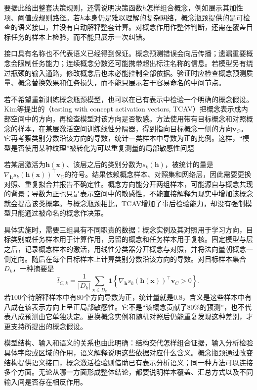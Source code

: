 要据此给出整套决策规则，还需说明决策函数$h$怎样组合概念，例如展示其加性项、阈值或规则路径。若$h$本身仍是难以理解的复杂网络，概念瓶颈提供的是可检查的语义接口，并没有自动解释整套计算。对概念作用作整体判断，还需在覆盖目标任务的样本上检验，而不能只展示一次纠错。

接口具有名称也不代表语义已经得到保证。概念预测错误会向后传播；遗漏重要概念会限制任务能力；连续概念分数还可能携带超出标注名称的信息。若模型另有绕过瓶颈的输入通路，修改概念后也未必能控制全部依据。验证时应检查概念预测质量、概念替换效果和任务损失，而不能只展示若干容易命名的中间节点。

若不希望重新训练概念瓶颈模型，也可以在已有表示中检验一个明确的概念假设。Kim等提出的（testing with concept activation vectors, TCAV）把概念表示成内部空间中的方向，再检查模型对该方向是否敏感。方法使用带有目标概念和对照概念的样本，在某层激活空间训练线性分隔器，得到指向目标概念一侧的方向$\bm{v}_C$。它再考察类别分数沿该方向的导数，统计一类样本中导数为正的比例。这样，“模型是否使用某种纹理”被转化为可以重复测量的局部敏感性问题

若某层激活为$\bm{h}(\bm{x})$、该层之后的类别分数为$s_k(\bm{h})$，被统计的量是$\nabla_{\bm h}s_k(\bm{h}(\bm{x}))^\top\bm{v}_C$的符号。结果依赖概念样本、对照集和网络层，因此需要更换对照、重复拟合并报告不确定性。概念方向能分开两组样本，可能源自与概念共现的背景；导数为正也只是表示空间中的敏感性，不能直接解释为现实中增加该概念就会提高该类概率。与概念瓶颈相比，TCAV增加了事后检验能力，却没有强制模型只能通过被命名的概念作决策。

具体实施时，需要三组具有不同职责的数据：概念实例及其对照用于学习方向，目标类别或任务样本用于计算作用，另留的概念和任务样本用于复核。固定模型与层之后，记录概念样本的激活，用线性分类器分开概念与对照，并将法向量朝概念一侧定向。随后在每个目标样本上计算类别分数沿该方向的导数。对目标样本集合$D_k$，一种摘要是
\[
 \widehat t_{C,k}
 =\frac1{|D_k|}\sum_{\bm{x}\in D_k}
 \mathbf1\!\left\{
 \nabla_{\bm h}s_k(\bm h(\bm{x}))^\top\bm v_C>0
 \right\}.
\]
若100个待解释样本中有80个方向导数为正，统计量就是0.8，含义是这些样本中有八成在该表示方向上呈正局部敏感性。它不是“该概念贡献了80\%的预测”，也不代表八成预测由它单独决定。更换概念实例和随机对照后仍能重复发现这种差别，才更支持所提出的概念假设。

模型结构、输入和语义的关系也由此明确：结构交代怎样组合证据，输入分析检验具体字段或区域的作用，语义解释说明这些依据对应什么含义。概念瓶颈通过改变结构提供语义接口，概念激活检验则借助已有表示分析语义；同一种方法可以连接多个方面。无论从哪一方面形成整体结论，都要说明样本覆盖、汇总方式以及不同输入间是否存在相反作用。

